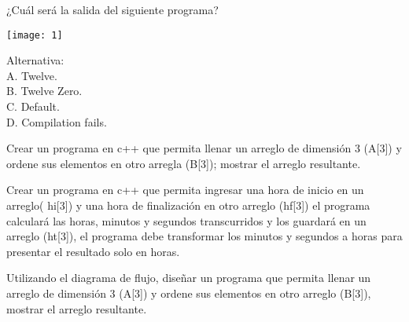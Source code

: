 \documentclass[12pt]{exam}
\begin{document}
\begin{questions}
\question[20] ¿Cuál será la salida del siguiente programa?

  \begin{minipage}[H]{0.45\linewidth}
  \texttt{[image: 1]}
\end{minipage}
  \begin{minipage}[H]{0.45\linewidth}

  Alternativa:\\
  A. Twelve.\\
  B. Twelve Zero.\\
  C. Default.\\
  D. Compilation fails.\\
\end{minipage}

  




\begin{minipage}[H]{0.45\linewidth}
\question[20] Crear un programa en c++ que permita llenar un arreglo de dimensión 3 (A[3]) y ordene sus elementos en otro arregla (B[3]); mostrar el arreglo resultante. 
\vspace{8cm}
  
\end{minipage} \hspace{1cm}
\begin{minipage}[H]{0.45\linewidth}
\question[20] Crear un programa en c++  que permita ingresar una hora de inicio en un arreglo( hi[3]) y una hora de finalización en otro arreglo (hf[3]) el programa calculará las horas, minutos y segundos transcurridos y los guardará en un arreglo (ht[3]), el programa debe transformar los minutos y segundos a horas para presentar el resultado solo en horas. 
\vspace{6cm}


\end{minipage}




\newpage

\begin{minipage}[H]{0.45\linewidth}
\question[20] Utilizando el diagrama de flujo, diseñar un programa que permita llenar un arreglo de dimensión 3 (A[3]) y ordene sus elementos en otro arreglo (B[3]), mostrar el arreglo resultante. 

  \begin{center}
\end{center}
\end{minipage}
\end{questions}
\end{document}
